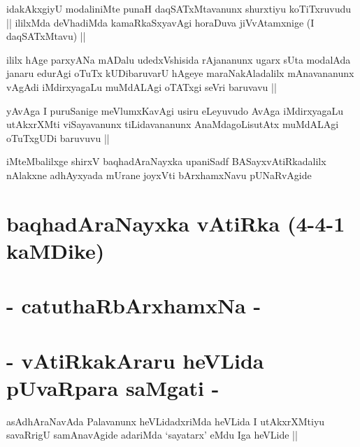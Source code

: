 \begin{artha}
idakAkxgiyU modaliniMte punaH daqSATxMtavanunx shurxtiyu koTiTxruvudu
|| ililxMda deVhadiMda kamaRkaSxyavAgi horaDuva jiVvAtamxnige (I
daqSATxMtavu) ||
\end{artha}


\begin{artha}
ililx hAge parxyANa mADalu udedxVshisida rAjananunx ugarx sUta
modalAda janaru edurAgi oTuTx kUDibaruvarU hAgeye maraNakAladalilx
mAnavananunx vAgAdi iMdirxyagaLu muMdALAgi oTATxgi seVri baruvavu ||
\end{artha}

\stext

\begin{artha}
yAvAga I puruSanige meVlumxKavAgi usiru eLeyuvudo AvAga iMdirxyagaLu
utAkxrXMti viSayavanunx tiLidavananunx AnaMdagoLisutAtx muMdALAgi
oTuTxgUDi baruvuvu ||
\end{artha}

\begin{center}
iMteMbalilxge shirxV baqhadAraNayxka upaniSadf BASayxvAtiRkadalilx
nAlakxne adhAyxyada mUrane joyxVti bArxhamxNavu  pUNaRvAgide 
\end{center}

\section*{baqhadAraNayxka vAtiRka (4-4-1 kaMDike)}

\section*{- catuthaRbArxhamxNa -}

\stext

\section*{- vAtiRkakAraru heVLida pUvaRpara saMgati -}


\begin{artha}
asAdhAraNavAda Palavanunx heVLidadxriMda heVLida I utAkxrXMtiyu
savaRrigU samAnavAgide adariMda `sayatarx' eMdu Iga heVLide ||
\end{artha}


